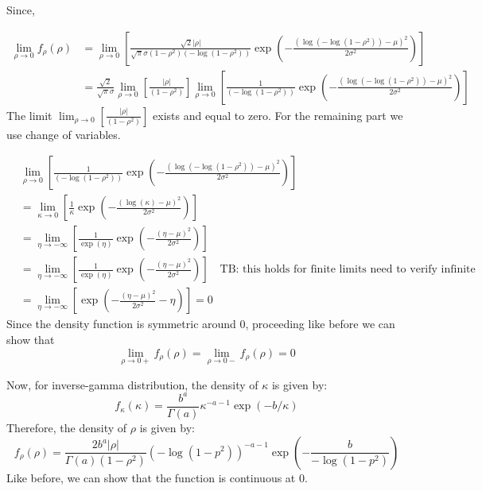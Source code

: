 \documentclass{amsart}
\begin{document}
Since,

\begin{align}
	\lim_{\rho\to 0}f_{\rho}(\rho)
	&= \lim_{\rho\to 0}\left[\frac{\sqrt{2}|\rho|}{\sqrt{\pi}\sigma(1-\rho^2)(-\log(1-\rho^2))} 
	\exp\left(-\frac{(\log(-\log(1-\rho^2))-\mu)^2}{2\sigma^2}\right)\right]\\
	&= \frac{\sqrt{2}}{\sqrt{\pi}\sigma}\lim_{\rho\to 0}\left[\frac{|\rho|}{(1-\rho^2)} \right]
	\lim_{\rho\to 0}\left[\frac{1}{(-\log(1-\rho^2))} 
	\exp\left(-\frac{(\log(-\log(1-\rho^2))-\mu)^2}{2\sigma^2}\right)\right]
\end{align}
The limit $\lim_{\rho\to 0}\left[\frac{|\rho|}{(1-\rho^2)} \right]$ exists and equal to zero. For the remaining part we use change of variables.

\begin{align}
	&\lim_{\rho\to 0}\left[\frac{1}{(-\log(1-\rho^2))} 
	\exp\left(-\frac{(\log(-\log(1-\rho^2))-\mu)^2}{2\sigma^2}\right)\right]\\
	& = \lim_{\kappa\to 0}\left[\frac{1}{\kappa} 
	\exp\left(-\frac{(\log(\kappa)-\mu)^2}{2\sigma^2}\right)\right]\\
	& = \lim_{\eta\to -\infty}\left[\frac{1}{\exp(\eta)} 
	\exp\left(-\frac{(\eta-\mu)^2}{2\sigma^2}\right)\right]\\
	& = \lim_{\eta\to -\infty}\left[\frac{1}{\exp(\eta)} 
	\exp\left(-\frac{(\eta-\mu)^2}{2\sigma^2}\right)\right]\quad \text{TB: this holds for finite limits need to verify infinite}\\
	& = \lim_{\eta\to -\infty}\left[ 
	\exp\left(-\frac{(\eta-\mu)^2}{2\sigma^2}-\eta\right)\right] = 0
\end{align}
Since the density function is symmetric around 0, proceeding like before we can show that
\begin{equation}
	\lim_{\rho\to 0+}f_{\rho}(\rho) = \lim_{\rho\to 0-}f_{\rho}(\rho) = 0
\end{equation}

Now, for inverse-gamma distribution, the density of $\kappa$ is given by:
\begin{equation}
	f_{\kappa}(\kappa)= \frac{b^{a}}{\Gamma(a)}
	\kappa^{-a-1}\exp(-b/\kappa)
\end{equation}
Therefore, the density of $\rho$ is given by:
\begin{equation}
	f_{\rho}(\rho) = \frac{2b^{a}|\rho|}{\Gamma(a)(1-\rho^2)}
	(-\log(1-p^2))^{-a-1}\exp\left(-\frac{b}{-\log(1-p^2)}\right)
\end{equation}
Like before, we can show that the function is continuous at 0.
\end{document}
